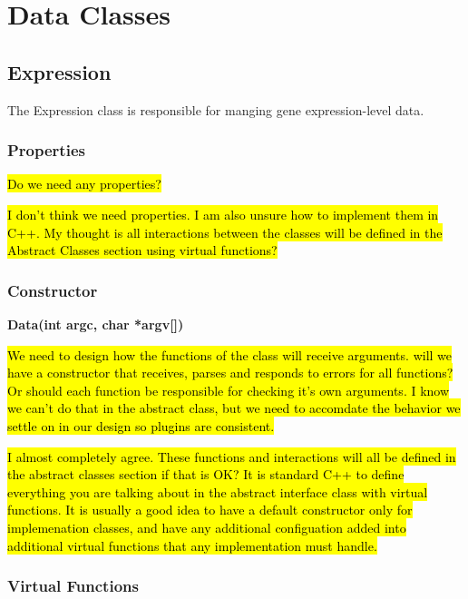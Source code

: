 \documentclass[10pt]{article}
\providecommand{\stephen}[1]{\sethlcolor{lyellow}\hl{#1}}
\providecommand{\josh}[1]{\sethlcolor{lblue}\hl{#1}}
\begin{document}
\newpage
\section{Data Classes}

\subsection{Expression}

The Expression class is responsible for manging gene expression-level data.  

\subsubsection{Properties}

\stephen{Do we need any properties?}

\josh{I don't think we need properties. I am also unsure how to implement them 
in C++. My thought is all interactions between the classes will be defined in 
the Abstract Classes section using virtual functions?}

\subsubsection{Constructor}

{\bfseries Data(int argc, char *argv[])}

\stephen{We need to design how the functions of the class will receive 
arguments.  will we have a constructor that receives, parses and responds to 
errors for all functions?  Or should each function be responsible for checking 
it's own arguments. I know we can't do that in the abstract class, but 
we need to accomdate the behavior we settle on in our design so plugins
are consistent.}

\josh{I almost completely agree. These functions and interactions will all be 
defined in the abstract classes section if that is OK? It is standard C++ to 
define everything you are talking about in the abstract interface class with 
virtual functions. It is usually a good idea to have a default constructor only 
for implemenation classes, and have any additional configuation added into 
additional virtual functions that any implementation must handle.}

\subsubsection{Virtual Functions}
\end{document}
